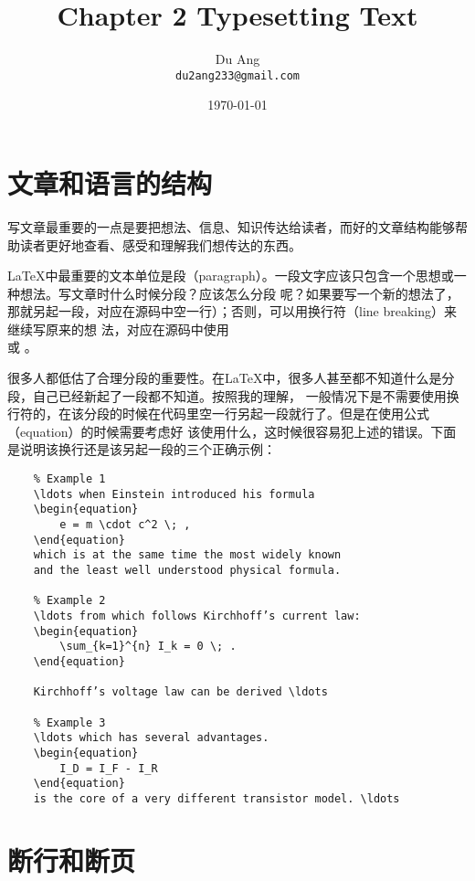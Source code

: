 \documentclass[UTF8]{ctexart}
\title{\heiti Chapter 2 Typesetting Text}
\author{\kaishu Du Ang \\ \texttt{du2ang233@gmail.com} }
\date{\today}
\begin{document}
\maketitle

\tableofcontents

\newpage
\section{文章和语言的结构}
写文章最重要的一点是要把想法、信息、知识传达给读者，而好的文章结构能够帮助读者更好地查看、感受和理解我们想传达的东西。

\LaTeX 中最重要的文本单位是段（paragraph）。一段文字应该只包含一个思想或一种想法。写文章时什么时候分段？应该怎么分段
呢？如果要写一个新的想法了，那就另起一段，对应在源码中空一行）；否则，可以用换行符（line breaking）来继续写原来的想
法，对应在源码中使用 \texttt{\\} 或 \texttt{\newline}。

很多人都低估了合理分段的重要性。在\LaTeX 中，很多人甚至都不知道什么是分段，自己已经新起了一段都不知道。按照我的理解，
一般情况下是不需要使用换行符的，在该分段的时候在代码里空一行另起一段就行了。但是在使用公式（equation）的时候需要考虑好
该使用什么，这时候很容易犯上述的错误。下面是说明该换行还是该另起一段的三个正确示例：
\begin{verbatim}
    % Example 1
    \ldots when Einstein introduced his formula
    \begin{equation}
        e = m \cdot c^2 \; ,
    \end{equation}
    which is at the same time the most widely known
    and the least well understood physical formula.

    % Example 2
    \ldots from which follows Kirchhoff’s current law:
    \begin{equation}
        \sum_{k=1}^{n} I_k = 0 \; .
    \end{equation}

    Kirchhoff’s voltage law can be derived \ldots

    % Example 3
    \ldots which has several advantages.
    \begin{equation}
        I_D = I_F - I_R
    \end{equation}
    is the core of a very different transistor model. \ldots
\end{verbatim}

\section{断行和断页}
\end{document}
